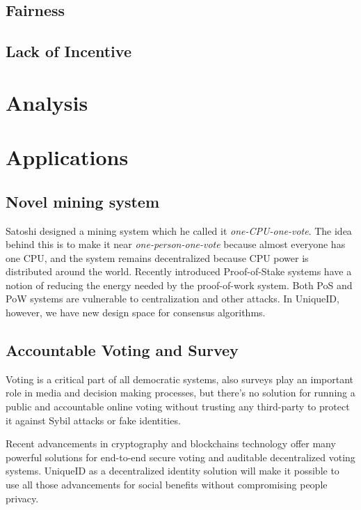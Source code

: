 \documentclass[conference]{IEEEtran}
\begin{document}
\subsection{Fairness}
\subsection{Lack of Incentive}


\section{Analysis}

 
\section{Applications}

\subsection{Novel mining system}
Satoshi designed a mining system which he called it \textit{one-CPU-one-vote}. The idea behind this is to make it near \textit{one-person-one-vote} because almost everyone has one CPU, and the system remains decentralized because CPU power is distributed around the world. Recently introduced Proof-of-Stake systems have a notion of reducing the energy needed by the proof-of-work system. Both PoS and PoW systems are vulnerable to centralization and other attacks. In UniqueID, however, we have new design space for consensus algorithms.

\subsection{Accountable Voting and Survey}
Voting is a critical part of all democratic systems, also surveys play an important role in media and decision making processes, but there's no solution for running a public and accountable online voting without trusting any third-party to protect it against Sybil attacks or fake identities.


Recent advancements in cryptography and blockchains technology offer many powerful solutions for end-to-end secure voting and auditable decentralized voting systems. UniqueID as a decentralized identity solution will make it possible to use all those advancements for social benefits without compromising people privacy.
\end{document}
